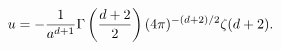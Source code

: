 \begin{equation}
u=-{1 \over {a^{d+1}}} \Gamma \left({d+2 \over 2}\right) (4 \pi)^{-(d+2)/2} \zeta (d+2).
\end{equation}

